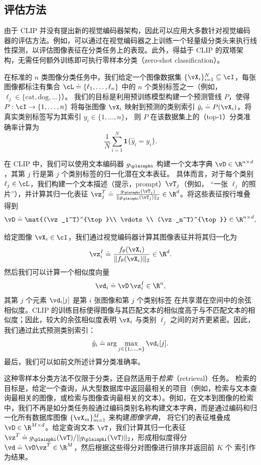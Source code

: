 \documentclass[../../book-main_zh.tex]{subfiles}
\begin{document}
\subsection{评估方法}\label{sub:clip_eval}
由于 CLIP 并没有提出新的视觉编码器架构，因此可以应用大多数针对视觉编码器的评估方法。例如，可以通过在视觉编码器之上训练一个轻量级分类头来执行线性探测，以评估图像表征在分类任务上的表现。此外，得益于 CLIP 的双塔架构，无需任何额外训练即可执行零样本分类（zero-shot classification）。

在标准的 \(n\) 类图像分类任务中，我们给定一个图像数据集
\(\{\vX_i\}_{i=1}^{N}\subseteq\cI\)，每张图像都标注有集合
\(\cL \doteq \{\ell_1,\ldots,\ell_n\}\) 中的 \(n\) 个类别标签之一（例如，\(\ell_j \in \{\text{cat},\text{dog},\ldots\}\)）。
我们的目标是利用预训练模型构建一个预测管线 \(P\)，使得
\(P:\cI\to\{1,\ldots,n\}\) 将每张图像 \(\vX_i\) 映射到预测的类别索引
\(\hat{y}_i \doteq P(\vX_i)\)。将真实类别标签写为其索引 \(y_i \in \{1,\ldots,n\}\)，
则 \(P\) 在该数据集上的（top-1）分类准确率计算为
\[
\frac{1}{N}\sum_{i=1}^{N}\boldsymbol{1}\{\hat{y}_i = y_i\}.
\]

在 CLIP 中，我们可以使用文本编码器 \(g_{\plainphi}\) 构建一个文本字典 \(\vD\in\R^{n\times d}\)，其第 \(j\) 行是第 \(j\) 个类别标签的归一化潜在文本表征。
具体而言，对于每个类别 \(\ell_j \in \cL\)，我们构建一个文本描述（提示，prompt）\(\vT_j\)（例如，
“一张 \(\ell_j\) 的照片”），并计算其归一化表征
\(\vz_j^T \doteq \frac{g_{\plainphi}(\vT_j)}{\|g_{\plainphi}(\vT_j)\|_2} \in \R^{d}\)。将这些表征按行堆叠得到
\[
\vD \doteq
\mat{(\vz_1^T)^{\top}\\ \vdots \\ (\vz_n^T)^{\top}}
\in \R^{n\times d},
\]

给定图像 \(\vX_i \in \cI\)，我们通过视觉编码器计算其图像表征并将其归一化为
\[
\vz_i^I \doteq \frac{f_{\theta}(\vX_i)}{\|f_{\theta}(\vX_i)\|_2} \in \R^{d}.
\]
然后我们可以计算一个相似度向量
\[
\vd_i \doteq \vD\,\vz_i^I \in \R^{n},
\]
其第 \(j\) 个元素 \(\vd_i[j]\) 是第 \(i\) 张图像和第 \(j\) 个类别标签
在共享潜在空间中的余弦相似度。CLIP 的训练目标使得图像与其匹配文本的相似度高于与不匹配文本的相似度；因此，较大的余弦相似度表明
\(\vX_i\) 与类别 \(\ell_j\) 之间的对齐更紧密。因此，我们通过此式预测类别索引：
\[
\hat{y}_i \doteq \arg\max_{j \in \{1,\ldots,n\}} \vd_i[j].
\]
最后，我们可以如前文所述计算分类准确率。

这种零样本分类方法不仅限于分类，还自然适用于\emph{检索}（retrieval）任务。
检索的目标是，给定一个查询，从大型数据库中返回最相关的项目（例如，检索与文本查询最相关的图像，或检索与图像查询最相关的文本）。例如，在文本到图像的检索中，我们不再是如分类任务般通过编码类别名称构建文本字典，而是通过编码和归一化所有数据库图像 \(\{\vX_m\}_{m=1}^{M}\) 来构建\emph{图像字典}，
将它们的表征堆叠成
\(\vD\in\R^{M\times d}\)。给定查询文本 \(\vT\)，我们计算其归一化表征
\(\vz^T \doteq g_{\plainphi}(\vT)/\|g_{\plainphi}(\vT)\|_2\)，形成相似度得分
\(\vd \doteq \vD\vz^T\in\R^{M}\)，然后根据这些得分对图像进行排序并返回前 \(K\) 个
索引作为结果。
\end{document}
